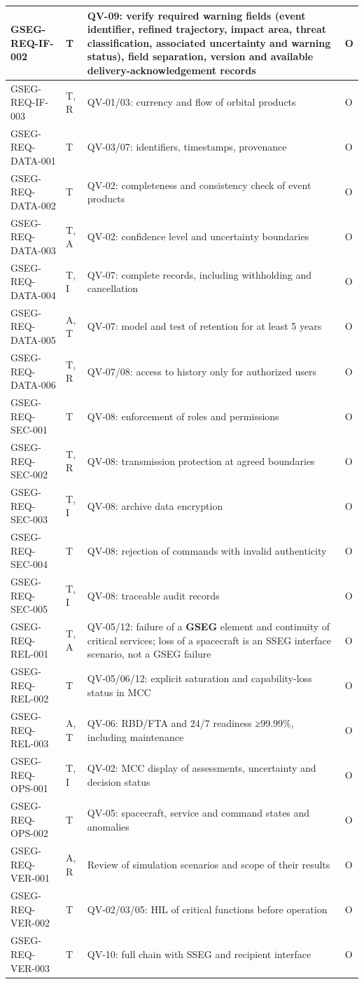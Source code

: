 \begin{longtable}{|P{0.27}|P{0.14}|P{0.49}|P{0.10}|}
GSEG-REQ-IF-002 & T & QV-09: verify required warning fields (event identifier, refined trajectory, impact area, threat classification, associated uncertainty and warning status), field separation, version and available delivery-acknowledgement records & O\\ \hline
GSEG-REQ-IF-003 & T, R & QV-01/\allowbreak{}03: currency and flow of orbital products & O\\ \hline
GSEG-REQ-DATA-001 & T & QV-03/\allowbreak{}07: identifiers, timestamps, provenance & O\\ \hline
GSEG-REQ-DATA-002 & T & QV-02: completeness and consistency check of event products & O\\ \hline
GSEG-REQ-DATA-003 & T, A & QV-02: confidence level and uncertainty boundaries & O\\ \hline
GSEG-REQ-DATA-004 & T, I & QV-07: complete records, including withholding and cancellation & O\\ \hline
GSEG-REQ-DATA-005 & A, T & QV-07: model and test of retention for at least 5 years & O\\ \hline
GSEG-REQ-DATA-006 & T, R & QV-07/\allowbreak{}08: access to history only for authorized users & O\\ \hline
GSEG-REQ-SEC-001 & T & QV-08: enforcement of roles and permissions & O\\ \hline
GSEG-REQ-SEC-002 & T, R & QV-08: transmission protection at agreed boundaries & O\\ \hline
GSEG-REQ-SEC-003 & T, I & QV-08: archive data encryption & O\\ \hline
GSEG-REQ-SEC-004 & T & QV-08: rejection of commands with invalid authenticity & O\\ \hline
GSEG-REQ-SEC-005 & T, I & QV-08: traceable audit records & O\\ \hline
GSEG-REQ-REL-001 & T, A & QV-05/\allowbreak{}12: failure of a \textbf{GSEG} element and continuity of critical services; loss of a spacecraft is an SSEG interface scenario, not a GSEG failure & O\\ \hline
GSEG-REQ-REL-002 & T & QV-05/\allowbreak{}06/\allowbreak{}12: explicit saturation and capability-loss status in MCC & O\\ \hline
GSEG-REQ-REL-003 & A, T & QV-06: RBD/\allowbreak{}FTA and 24/\allowbreak{}7 readiness ≥99.99\%, including maintenance & O\\ \hline
GSEG-REQ-OPS-001 & T, I & QV-02: MCC display of assessments, uncertainty and decision status & O\\ \hline
GSEG-REQ-OPS-002 & T & QV-05: spacecraft, service and command states and anomalies & O\\ \hline
GSEG-REQ-VER-001 & A, R & Review of simulation scenarios and scope of their results & O\\ \hline
GSEG-REQ-VER-002 & T & QV-02/\allowbreak{}03/\allowbreak{}05: HIL of critical functions before operation & O\\ \hline
GSEG-REQ-VER-003 & T & QV-10: full chain with SSEG and recipient interface & O\\*
\end{longtable}
\endgroup

